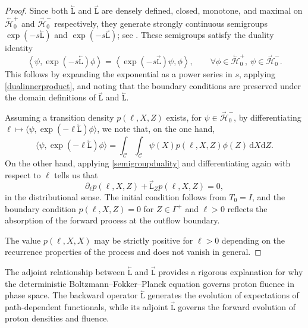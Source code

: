 \documentclass{amsart}
\newcommand{\dd}{{\mathrm d}}
\newcommand{\fL}{\stackrel{_\rightarrow}{\mathtt L}}
\newcommand{\bL}{\stackrel{_\leftarrow}{\mathtt L}}
\theoremstyle{plain}
\newcommand{\ltwop}[2]{\ensuremath{\!\left\langle{#1,#2}\right\rangle}}
\newcommand{\cH}{\stackrel{_\rightarrow}{\mathscr H}}
\newcommand{\cbH}{\stackrel{_\leftarrow}{\mathscr H}}
\begin{document}
  \begin{proof}
%
Since both $\bL$ and $\fL$ are densely defined, closed, monotone, and
maximal on $\cbH_0^+$ and $\cH_0^-$ respectively, they generate
strongly continuous semigroups $\exp(-s\bL)$ and $\exp(-s\fL)$; see
\cite{pazy2012semigroups, engel2000one}. These semigroups satisfy the
duality identity
\begin{equation}
  \ltwop{\psi}{\exp(-s \bL) \phi} = \ltwop{\exp(-s \fL) \psi}{\phi}, \qquad \forall \phi \in \cbH_0^+,~ \psi \in \cH_0^-.
  \label{semigroupduality}
\end{equation}
This follows by expanding the exponential as a power series in $s$,
applying \eqref{dualinnerproduct}, and noting that the boundary
conditions are preserved under the domain definitions of $\fL$ and
$\bL$.

Assuming a transition density $p(\ell, X, Z)$ exists, for $\psi \in \cH_0^-$, by differentiating $\ell\mapsto \langle\psi, \exp(-\ell \bL) \phi\rangle $, we note that, on the one hand, 
\begin{equation}
 \langle\psi, \exp(-\ell \bL) \phi\rangle  = \int_{\mathcal{C}}\int_{\mathcal{C}}\psi(X) p(\ell, X, Z) \phi(Z) \, \dd X\dd Z.
\end{equation}
On the other hand,  applying
\eqref{semigroupduality} and differentiating again with respect to $\ell$ tells us that 
\begin{equation}
  \partial_\ell p(\ell, X, Z) + \fL_Z p(\ell, X, Z) = 0,
\end{equation}
in the distributional sense. The initial condition follows from $T_0 =
I$, and the boundary condition $p(\ell, X, Z) = 0$ for $Z \in
\Gamma^+$ and $\ell > 0$ reflects the absorption of the forward
process at the outflow boundary.

The value $p(\ell, X, X)$ may be strictly positive for $\ell > 0$
depending on the recurrence properties of the process and does not
vanish in general.
\end{proof}
 
  
The adjoint relationship between $\bL$ and $\fL$ provides a rigorous
explanation for why the deterministic Boltzmann--Fokker--Planck
equation governs proton fluence in phase space. The backward operator
$\bL$ generates the evolution of expectations of path-dependent
functionals, while its adjoint $\fL$ governs the forward evolution of
proton densities and fluence.
\end{document}
